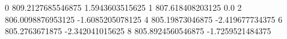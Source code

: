 0 809.2127685546875 1.5943603515625
1 807.618408203125 0.0
2 806.0098876953125 -1.6085205078125
4 805.19873046875 -2.419677734375
6 805.2763671875 -2.342041015625
8 805.8924560546875 -1.7259521484375
